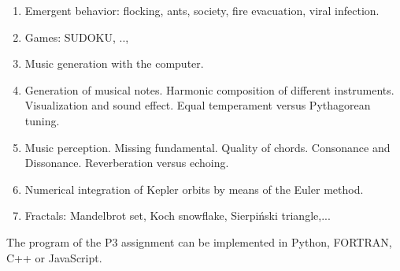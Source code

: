 \documentclass[12pt,spanish]{article}
\begin{document}
\begin{enumerate}





\item Emergent behavior: flocking, ants, society, fire evacuation, viral infection. 
\item Games: SUDOKU, ..,



%

\item Music generation with the computer. 

\item Generation of musical notes. Harmonic composition of different instruments. Visualization and sound effect.
Equal temperament versus Pythagorean tuning. 

\item Music perception. Missing fundamental. Quality of chords. Consonance and Dissonance. 
Reverberation versus echoing. 

\item Numerical integration of Kepler orbits by means of the Euler method. 
 
 \item Fractals: Mandelbrot set, Koch snowflake, Sierpiński triangle,... 
 
\end{enumerate}
The program of the  P3 assignment can be implemented in Python, FORTRAN, C++ or JavaScript. 
\end{document}
